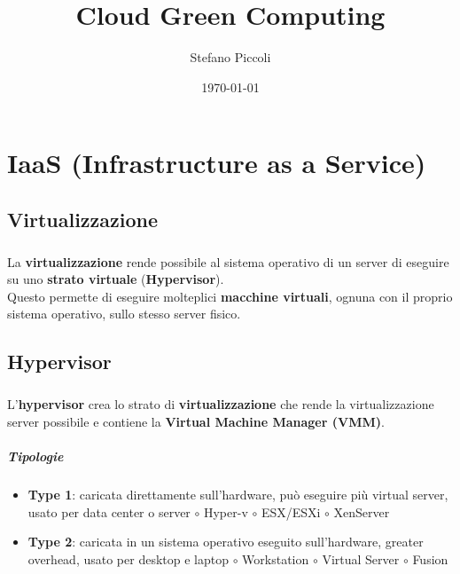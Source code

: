 \documentclass[a4paper, 12pt]{report}
\begin{document}
\title{
\textbf{Cloud Green Computing}}
\author{Stefano Piccoli}
\date{\today}
\maketitle
\tableofcontents
    \chapter{IaaS (Infrastructure as a Service)}
      \section{Virtualizzazione}
        \paragraph{}La \textbf{virtualizzazione} rende possibile al sistema operativo di un server di eseguire su uno \textbf{strato virtuale} (\textbf{Hypervisor}).\\
        Questo permette di eseguire molteplici \textbf{macchine virtuali}, ognuna con il proprio sistema operativo, sullo stesso server fisico.
      \section{Hypervisor}
        \paragraph{}L'\textbf{hypervisor} crea lo strato di \textbf{virtualizzazione} che rende la virtualizzazione server possibile e contiene la \textbf{Virtual Machine Manager (VMM)}.
        \paragraph{Tipologie}
        \begin{itemize}
          \item \textbf{Type 1}: caricata direttamente sull'hardware, può eseguire più virtual server, usato per data center o server
            \subitem $\circ$ Hyper-v 
            \subitem $\circ$ ESX/ESXi 
            \subitem $\circ$ XenServer
          \item \textbf{Type 2}: caricata in un sistema operativo eseguito sull'hardware, greater overhead, usato per desktop e laptop
            \subitem $\circ$ Workstation 
            \subitem $\circ$ Virtual Server
            \subitem $\circ$ Fusion
        \end{itemize}
\end{document}
